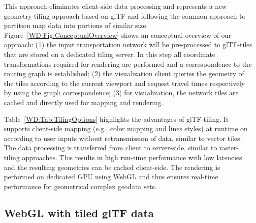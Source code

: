      This approach eliminates client-side data processing and represents a new geometry-tiling
      approach based on glTF and following the common approach to partition map data
      into portions of similar size. Figure~\ref{WD:Fig:ConceptualOverview} shows an conceptual
      overview of our approach: (1) the input transportation network will be pre-processed
      to glTF-tiles that are stored on a dedicated tiling server. In this step all
      coordinate transformations required for rendering are performed and a correspondence
      to the routing graph is established; (2) the visualization client queries the
      geometry of the tiles according to the current viewport and request travel times
      respectively by using the graph correspondence; (3) for visualization, the network
      tiles are cached and directly used for mapping and rendering.\par
      Table~\ref{WD:Tab:TilingOptions} highlights the advantages of glTF-tiling. It
      supports client-side mapping (e.g., color mapping and lines styles) at runtime
      on according to user inputs without retransmission of data, similar to vector
      tiles. The data processing is transferred from client to server-side, similar
      to raster-tiling approaches. This results in high run-time performance with
      low latencies and the resulting geometries can be cached client-side. The
      rendering is performed on dedicated GPU using WebGL and thus ensures real-time
      performance for geometrical complex geodata sets.\par


    \subsection{WebGL with tiled glTF data}
